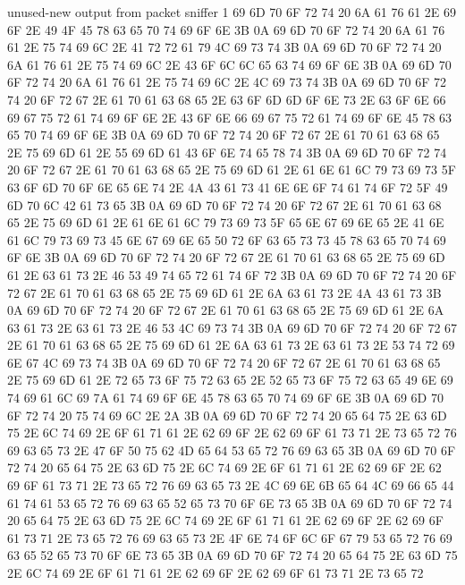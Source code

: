 \begin{chunk}{unused-new output from packet sniffer}
1
69 6D 70 6F 72 74 20 6A 61 76 61 2E 69 6F 2E 49 4F 45 78 63 65 70 74 69 6F 
6E 3B 0A 69 6D 70 6F 72 74 20 6A 61 76 61 2E 75 74 69 6C 2E 41 72 72 61 79 
4C 69 73 74 3B 0A 69 6D 70 6F 72 74 20 6A 61 76 61 2E 75 74 69 6C 2E 43 6F 
6C 6C 65 63 74 69 6F 6E 3B 0A 69 6D 70 6F 72 74 20 6A 61 76 61 2E 75 74 69 
6C 2E 4C 69 73 74 3B 0A 69 6D 70 6F 72 74 20 6F 72 67 2E 61 70 61 63 68 65 
2E 63 6F 6D 6D 6F 6E 73 2E 63 6F 6E 66 69 67 75 72 61 74 69 6F 6E 2E 43 6F 
6E 66 69 67 75 72 61 74 69 6F 6E 45 78 63 65 70 74 69 6F 6E 3B 0A 69 6D 70 
6F 72 74 20 6F 72 67 2E 61 70 61 63 68 65 2E 75 69 6D 61 2E 55 69 6D 61 43 
6F 6E 74 65 78 74 3B 0A 69 6D 70 6F 72 74 20 6F 72 67 2E 61 70 61 63 68 65 
2E 75 69 6D 61 2E 61 6E 61 6C 79 73 69 73 5F 63 6F 6D 70 6F 6E 65 6E 74 2E 
4A 43 61 73 41 6E 6E 6F 74 61 74 6F 72 5F 49 6D 70 6C 42 61 73 65 3B 0A 69 
6D 70 6F 72 74 20 6F 72 67 2E 61 70 61 63 68 65 2E 75 69 6D 61 2E 61 6E 61 
6C 79 73 69 73 5F 65 6E 67 69 6E 65 2E 41 6E 61 6C 79 73 69 73 45 6E 67 69 
6E 65 50 72 6F 63 65 73 73 45 78 63 65 70 74 69 6F 6E 3B 0A 69 6D 70 6F 72 
74 20 6F 72 67 2E 61 70 61 63 68 65 2E 75 69 6D 61 2E 63 61 73 2E 46 53 49 
74 65 72 61 74 6F 72 3B 0A 69 6D 70 6F 72 74 20 6F 72 67 2E 61 70 61 63 68 
65 2E 75 69 6D 61 2E 6A 63 61 73 2E 4A 43 61 73 3B 0A 69 6D 70 6F 72 74 20 
6F 72 67 2E 61 70 61 63 68 65 2E 75 69 6D 61 2E 6A 63 61 73 2E 63 61 73 2E 
46 53 4C 69 73 74 3B 0A 69 6D 70 6F 72 74 20 6F 72 67 2E 61 70 61 63 68 65 
2E 75 69 6D 61 2E 6A 63 61 73 2E 63 61 73 2E 53 74 72 69 6E 67 4C 69 73 74 
3B 0A 69 6D 70 6F 72 74 20 6F 72 67 2E 61 70 61 63 68 65 2E 75 69 6D 61 2E 
72 65 73 6F 75 72 63 65 2E 52 65 73 6F 75 72 63 65 49 6E 69 74 69 61 6C 69 
7A 61 74 69 6F 6E 45 78 63 65 70 74 69 6F 6E 3B 0A 69 6D 70 6F 72 74 20 75 
74 69 6C 2E 2A 3B 0A 69 6D 70 6F 72 74 20 65 64 75 2E 63 6D 75 2E 6C 74 69 
2E 6F 61 71 61 2E 62 69 6F 2E 62 69 6F 61 73 71 2E 73 65 72 76 69 63 65 73 
2E 47 6F 50 75 62 4D 65 64 53 65 72 76 69 63 65 3B 0A 69 6D 70 6F 72 74 20 
65 64 75 2E 63 6D 75 2E 6C 74 69 2E 6F 61 71 61 2E 62 69 6F 2E 62 69 6F 61 
73 71 2E 73 65 72 76 69 63 65 73 2E 4C 69 6E 6B 65 64 4C 69 66 65 44 61 74 
61 53 65 72 76 69 63 65 52 65 73 70 6F 6E 73 65 3B 0A 69 6D 70 6F 72 74 20 
65 64 75 2E 63 6D 75 2E 6C 74 69 2E 6F 61 71 61 2E 62 69 6F 2E 62 69 6F 61 
73 71 2E 73 65 72 76 69 63 65 73 2E 4F 6E 74 6F 6C 6F 67 79 53 65 72 76 69 
63 65 52 65 73 70 6F 6E 73 65 3B 0A 69 6D 70 6F 72 74 20 65 64 75 2E 63 6D 
75 2E 6C 74 69 2E 6F 61 71 61 2E 62 69 6F 2E 62 69 6F 61 73 71 2E 73 65 72 

\end{chunk}

